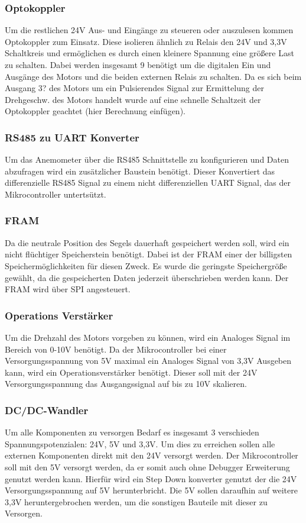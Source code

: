 \subsubsection{Optokoppler}
Um die restlichen 24V Aus- und Eingänge zu steueren oder auszulesen kommen Optokoppler zum Einsatz. Diese isolieren ähnlich zu Relais den 24V und 3,3V Schaltkreis und ermöglichen es durch einen kleinere Spannung eine größere Last zu schalten. Dabei werden insgesamt 9 benötigt um die digitalen Ein und Ausgänge des Motors und die beiden externen Relais zu schalten. Da es sich beim Ausgang 3? des Motors um ein Pulsierendes Signal zur Ermittelung der Drehgeschw. des Motors handelt wurde auf eine schnelle Schaltzeit der Optokoppler geachtet (hier Berechnung einfügen).
\subsubsection{RS485 zu UART Konverter}
Um das Anemometer über die RS485 Schnittstelle zu konfigurieren und Daten abzufragen wird ein zusätzlicher Baustein benötigt. Dieser Konvertiert das differenzielle RS485 Signal zu einem nicht differenziellen \ac{UART} Signal, das der Mikrocontroller untertsützt.
\subsubsection{FRAM}
Da die neutrale Position des Segels dauerhaft gespeichert werden soll, wird ein nicht flüchtiger Speicherstein benötigt. Dabei ist der \ac{FRAM} einer der billigsten Speichermöglichkeiten für diesen Zweck. Es wurde die geringste Speichergröße gewählt, da die gespeicherten Daten jederzeit überschrieben werden kann. Der FRAM wird über \ac{SPI} angesteuert.
\subsubsection{Operations Verstärker}
Um die Drehzahl des Motors vorgeben zu können, wird ein Analoges Signal im Bereich von 0-10V benötigt. Da der Mikrocontroller bei einer Versorgungsspannung von 5V maximal ein Analoges Signal von 3,3V Ausgeben kann, wird ein Operationsverstärker benötigt. Dieser soll mit der 24V Versorgungsspannung das Ausgangssignal auf bis zu 10V skalieren.
\subsubsection{DC/DC-Wandler}
Um alle Komponenten zu versorgen Bedarf es insgesamt 3 verschieden Spannungspotenzialen: 24V, 5V und 3,3V. Um dies zu erreichen sollen alle externen Komponenten direkt mit den 24V versorgt werden. Der Mikrocontroller soll mit den 5V versorgt werden, da er somit auch ohne Debugger Erweiterung genutzt werden kann. Hierfür wird ein Step Down konverter genutzt der die 24V Versorgungsspannung auf 5V herunterbricht. Die 5V sollen daraufhin auf weitere 3,3V heruntergebrochen werden, um die sonstigen Bauteile mit dieser zu Versorgen.
